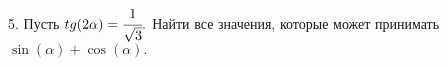 5. Пусть $tg(2\alpha)=\cfrac{1}{\sqrt{3}}.$ Найти все значения, которые может принимать $\sin(\alpha)+\cos(\alpha).$\\
